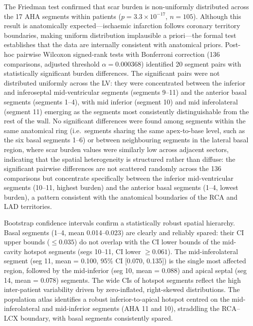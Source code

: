 The Friedman test confirmed that scar burden is non-uniformly distributed across the 17 AHA
segments within patients ($p = 3.3 \times 10^{-17}$, $n = 105$). Although
this result is anatomically expected---ischaemic infarction follows coronary territory
boundaries, making uniform distribution implausible a priori---the formal test establishes that
the data are internally consistent with anatomical priors. Post-hoc pairwise Wilcoxon signed-rank tests with
Bonferroni correction (136 comparisons, adjusted threshold $\alpha = 0.000368$) identified
20 segment pairs with statistically significant burden differences. The significant pairs were
not distributed uniformly across the LV: they were concentrated between the inferior and
inferoseptal mid-ventricular segments (segments 9--11) and the anterior basal segments
(segments 1--4), with mid inferior (segment 10) and mid inferolateral (segment 11) emerging
as the segments most consistently distinguishable from the rest of the wall. No significant
differences were found among segments within the same anatomical ring (i.e.\ segments
sharing the same apex-to-base level, such as the six basal segments 1--6) or between
neighbouring segments in the lateral basal region, where scar burden values were similarly
low across adjacent sectors, indicating that the spatial heterogeneity is structured rather
than diffuse: the significant pairwise differences are not scattered randomly across the 136
comparisons but concentrate specifically between the inferior mid-ventricular segments
(10--11, highest burden) and the anterior basal segments (1--4, lowest burden), a pattern
consistent with the anatomical boundaries of the RCA and LAD territories.

Bootstrap confidence intervals confirm a statistically robust spatial hierarchy. Basal
segments (1--4, mean 0.014--0.023) are clearly and reliably spared: their CI upper bounds
($\leq 0.035$) do not overlap with the CI lower bounds of the mid-cavity hotspot segments
(segs 10--11, CI lower $\geq 0.061$). The mid-inferolateral segment (seg 11, mean = 0.100,
95\% CI [0.070, 0.135]) is the single most affected region, followed by the mid-inferior
(seg 10, mean = 0.088) and apical septal (seg 14, mean = 0.078) segments. The wide CIs
of hotspot segments reflect the high inter-patient variability driven by zero-inflated,
right-skewed distributions. The population atlas identifies a robust inferior-to-apical hotspot
centred on the mid-inferolateral and mid-inferior segments (AHA 11 and 10), straddling the
RCA--LCX boundary, with basal segments consistently spared.

